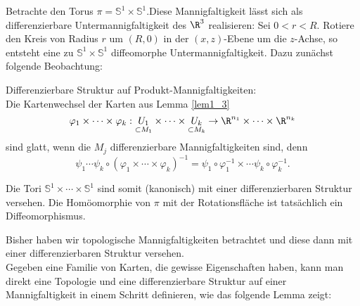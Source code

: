 \begin{exmp*}
	Betrachte den Torus $ \pi = \mathbb{S}^1 \times \mathbb{S}^1 $.Diese Mannigfaltigkeit lässt sich als differenzierbare Untermannigfaltigkeit des $\R^3$ realisieren: Sei $ 0 < r < R $. Rotiere den Kreis von Radius $r$ um $ (R,0) $ in der $(x,z)$-Ebene um die $z$-Achse, so entsteht eine zu $ \mathbb{S}^1 \times \mathbb{S}^1 $ diffeomorphe Untermannigfaltigkeit. Dazu zunächst folgende Beobachtung:
	\begin{rem}
		Differenzierbare Struktur auf Produkt-Mannigfaltigkeiten:\\
		Die Kartenwechsel der Karten aus Lemma \ref{lem1_3} 
		\[ \varphi_1 \times \dotsm \times \varphi_k: \underset{\subset M_1}{U_1} \times \dotsm \times \underset{\subset M_k}{U_k} \to \R^{n_1} \times \dotsm \times \R^{n_k} \]
		sind glatt, wenn die $M_j$ differenzierbare Mannigfaltigkeiten sind, denn 
		\[ \psi_1 \dotsm \psi_k \circ (\varphi_1 \times \dotsm \times \varphi_k)^{-1} = \psi_1 \circ \varphi_1^{-1} \times \dotsm \psi_k \circ \varphi_k^{-1}. \]
	\end{rem}
	Die Tori $ \mathbb{S}^1 \times \dotsm \times \mathbb{S}^1 $ sind somit (kanonisch) mit einer differenzierbaren Struktur versehen. Die Homöomorphie von $\pi$ mit der Rotationsfläche ist tatsächlich ein Diffeomorphismus.
\end{exmp*}

\begin{rem*}
	Bisher haben wir topologische Mannigfaltigkeiten betrachtet und diese dann mit einer differenzierbaren Struktur versehen.\\
	Gegeben eine Familie von Karten, die gewisse Eigenschaften haben, kann man direkt eine Topologie und eine differenzierbare Struktur auf einer Mannigfaltigkeit in einem Schritt definieren, wie das folgende Lemma zeigt:
\end{rem*}

